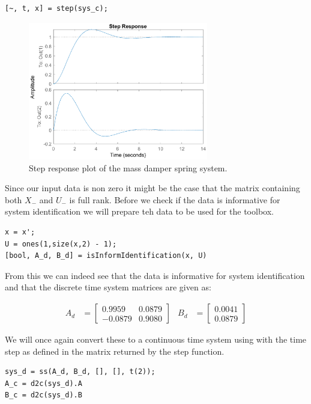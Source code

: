 \begin{lstlisting}
[~, t, x] = step(sys_c);
\end{lstlisting}

\begin{figure}[H]
	\centering
	\includegraphics[width=0.7\textwidth]{step_response_msd.eps}
	\caption{Step response plot of the mass damper spring system.}
\end{figure}

Since our input data is non zero it might be the case that the matrix containing both $X_-$ and $U_-$ is full rank. Before we check if the data is informative for system identification we will prepare teh data to be used for the toolbox.

\begin{lstlisting}
x = x';
U = ones(1,size(x,2) - 1);
[bool, A_d, B_d] = isInformIdentification(x, U)
\end{lstlisting}

From this we can indeed see that the data is informative for system identification and that the discrete time system matrices are given as:

\begin{align*}
	A_d &= \begin{bmatrix} 0.9959 & 0.0879 \\ -0.0879 & 0.9080 \end{bmatrix} &
	B_d &= \begin{bmatrix} 0.0041 \\ 0.0879 \end{bmatrix} 
\end{align*}

We will once again convert these to a continuous time system using  with the time step as defined in the  matrix returned by the step function.

\begin{lstlisting}
sys_d = ss(A_d, B_d, [], [], t(2));
A_c = d2c(sys_d).A
B_c = d2c(sys_d).B
\end{lstlisting}

